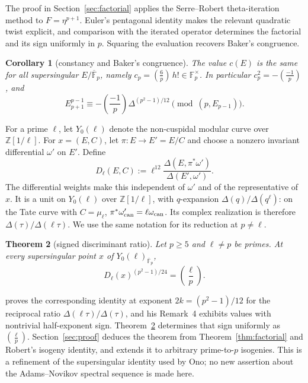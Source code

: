 \documentclass[11pt,a4paper]{article}
\numberwithin{equation}{section}
\newtheorem{theorem}{Theorem}[section]
\newtheorem{corollary}[theorem]{Corollary}
\theoremstyle{definition}
\theoremstyle{remark}
\newcommand{\Fp}{\mathbb F_p}
\newcommand{\Fb}{\overline{\mathbb F}_p}
\newcommand{\Z}{\mathbb Z}
\newcommand{\leg}[2]{\left(\frac{#1}{#2}\right)}
\newcommand{\Lp}[1]{\left(\frac{#1}{p}\right)}
\begin{document}
The proof in Section~\ref{sec:factorial} applies the Serre--Robert
theta-iteration method to $F=\eta^{p+1}$. Euler's pentagonal identity
makes the relevant quadratic twist explicit, and comparison with the
iterated operator determines the factorial and its sign uniformly in $p$.
Squaring the evaluation recovers Baker's congruence.

\begin{corollary}[constancy and Baker's congruence]\label{cor:D}
The value $c(E)$ is the same for all supersingular $E/\Fb$, namely
$c_p=\Lp6\,h!\in\Fp^\times$. In particular
$c_p^2=-\Lp{-1}$, and
\[
E_{p+1}^{p-1}\equiv-\Lp{-1}\Delta^{(p^2-1)/12}
\pmod{(p,E_{p-1})}.
\]
\end{corollary}

For a prime $\ell$, let $Y_0(\ell)$ denote the non-cuspidal modular
curve over $\Z[1/\ell]$. For $x=(E,C)$, let $\pi:E\to E'=E/C$ and
choose a nonzero invariant differential $\omega'$ on $E'$. Define
\begin{equation}\label{eq:Dmoduli}
D_\ell(E,C):=\ell^{12}
\frac{\Delta(E,\pi^*\omega')}{\Delta(E',\omega')}.
\end{equation}
The differential weights make this independent of $\omega'$ and of the
representative of $x$. It is a unit on $Y_0(\ell)$ over $\Z[1/\ell]$,
with $q$-expansion $\Delta(q)/\Delta(q^\ell)$: on the Tate curve with
$C=\mu_\ell$, $\pi^*\omega'_{\rm can}=\ell\omega_{\rm can}$.
Its complex realization is therefore $\Delta(\tau)/\Delta(\ell\tau)$.
We use the same notation for its reduction at $p\ne\ell$.

\begin{samepage}
\begin{theorem}[signed discriminant ratio]\label{thm:C}
Let $p\ge5$ and $\ell\ne p$ be primes. At every supersingular point
$x$ of $Y_0(\ell)_{\Fb}$,
\[
D_\ell(x)^{(p^2-1)/24}=\leg{\ell}{p}.
\]
\end{theorem}
\end{samepage}



\citet[Theorem~1.2]{Ono25} proves the corresponding identity at exponent
$2k=(p^2-1)/12$ for the reciprocal ratio
$\Delta(\ell\tau)/\Delta(\tau)$, and his Remark~4 exhibits values
with nontrivial half-exponent sign. Theorem~\ref{thm:C} determines
that sign uniformly as $\left(\frac{\ell}{p}\right)$.
Section~\ref{sec:proof} deduces the theorem from
Theorem~\ref{thm:factorial} and Robert's isogeny identity, and extends
it to arbitrary prime-to-$p$ isogenies. This is a refinement of the
supersingular identity used by Ono; no new assertion about the
Adams--Novikov spectral sequence is made here.
\end{document}
